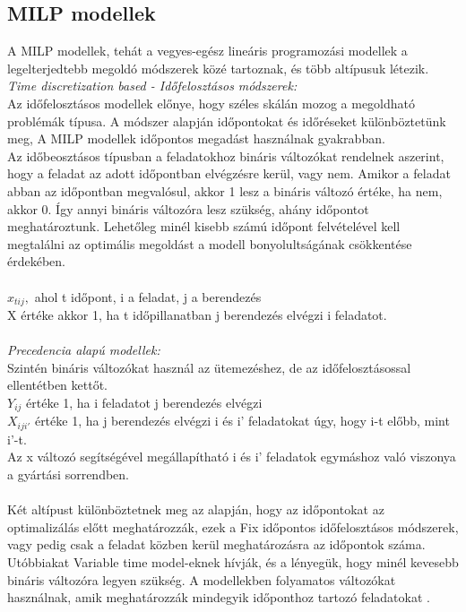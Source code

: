 \documentclass [12pt]{report}
\begin{document}
\subsection{MILP modellek}
  A MILP modellek, tehát a vegyes-egész lineáris programozási modellek a legelterjedtebb megoldó módszerek közé tartoznak, és több altípusuk létezik.\\
  \emph{Time discretization based - Időfelosztásos módszerek:}\\
   Az időfelosztásos modellek előnye, hogy széles skálán mozog a megoldható problémák típusa.
  A módszer alapján időpontokat és időréseket különböztetünk meg, A MILP modellek időpontos megadást használnak gyakrabban.  \\
  Az időbeosztásos típusban a feladatokhoz bináris változókat rendelnek aszerint, hogy a feladat az adott időpontban elvégzésre kerül, vagy nem. Amikor a feladat abban az időpontban megvalósul, akkor 1 lesz a bináris változó értéke, ha nem, akkor 0. Így annyi bináris változóra lesz szükség, ahány időpontot meghatároztunk. Lehetőleg minél kisebb számú időpont felvételével kell megtalálni az optimális megoldást a modell bonyolultságának csökkentése érdekében.\\\\
  $x_{tij},$ ahol t időpont, i a feladat, j a berendezés\\ X értéke akkor 1, ha t időpillanatban j berendezés elvégzi i feladatot.\\\\
 \emph{Precedencia alapú modellek:}\\
  Szintén bináris változókat használ az ütemezéshez, de az időfelosztásossal ellentétben kettőt. \\
  $Y_{ij}$ értéke 1, ha i feladatot j berendezés elvégzi\\
  $X_{iji'}$ értéke 1, ha j berendezés elvégzi i és i' feladatokat úgy, hogy i-t előbb, mint i'-t.\\
  Az x változó segítségével megállapítható i és i' feladatok egymáshoz való viszonya a gyártási sorrendben. \\\\
 Két altípust különböztetnek meg az alapján, hogy az időpontokat az optimalizálás előtt meghatározzák, ezek a Fix időpontos időfelosztásos módszerek, vagy pedig csak a feladat közben kerül meghatározásra az időpontok száma. Utóbbiakat Variable time model-eknek hívják, és a lényegük, hogy minél kevesebb bináris változóra legyen szükség. A modellekben folyamatos változókat használnak, amik meghatározzák mindegyik időponthoz tartozó feladatokat \cite{Mendez2006}. 
 
\end{document}
